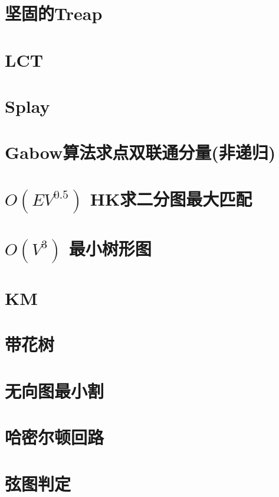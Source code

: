\documentclass[landscape, twocolumn, 8pt, a4paper, twoside]{extarticle}
\begin{document}
\section{坚固的Treap}
	
\section{LCT}
	
\section{Splay}
	

\section{Gabow算法求点双联通分量(非递归)}
	
\section{$O(EV^{0.5})$ HK求二分图最大匹配}
	
\section{$O(V^3)$ 最小树形图}
	
\section{KM}
	
\section{带花树}
	
\section{无向图最小割}
	
\section{哈密尔顿回路}
	
\section{弦图判定}
	
\end{document}

